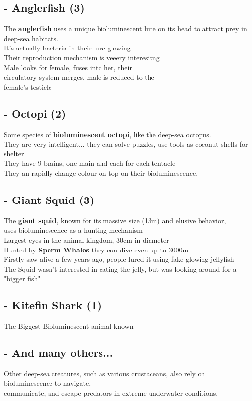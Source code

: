 \documentclass{article}
\begin{document}
\subsection*{- Anglerfish (3)}
The \textbf{anglerfish} uses a unique bioluminescent lure on its head to attract prey in deep-sea habitats.\\
It's actually bacteria in their lure glowing.\\
Their reproduction mechanism is veeery interesitng\\
Male looks for female, fuses into her, their\\
circulatory system merges, male is reduced to the \\
female's testicle

\subsection*{- Octopi (2)}
Some species of \textbf{bioluminescent octopi}, like the deep-sea octopus.\\
They are very intelligent... they can solve puzzles, use tools as coconut shells for shelter\\
They have 9 brains, one main and each for each tentacle\\
They an rapidly change colour on top on their bioluminescence.

\subsection*{- Giant Squid (3)}
The \textbf{giant squid}, known for its massive size (13m) and elusive behavior, \\
uses bioluminescence as a hunting mechanism\\
Largest eyes in the animal kingdom, 30cm in diameter\\
Hunted by \textbf{Sperm Whales} they can dive even up to 3000m\\
Firstly saw alive a few years ago, people lured it using fake glowing jellyfish \\
The Squid wasn't interested in eating the jelly, but was looking around for a "bigger fish"\\

\subsection*{- Kitefin Shark (1)}
The Biggest Bioluminescent animal known

\subsection*{- And many others... }
Other deep-sea creatures, such as various crustaceans, also rely on bioluminescence to navigate,\\
communicate, and escape predators in extreme underwater conditions.
\end{document}
